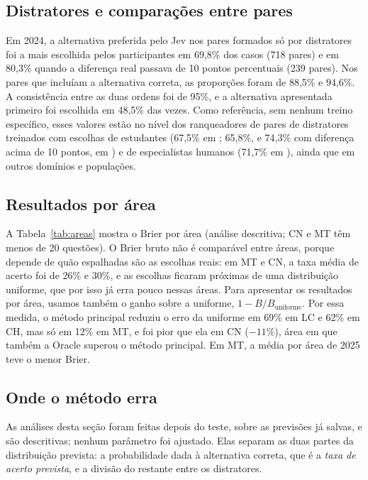 \subsection{Distratores e comparações entre pares}\label{sec:res-pares}

Em 2024, a alternativa preferida pelo Jev nos pares formados só por distratores foi a mais escolhida pelos participantes em 69,8\% dos casos (718 pares) e em 80,3\% quando a diferença real passava de 10 pontos percentuais (239 pares). Nos pares que incluíam a alternativa correta, as proporções foram de 88,5\% e 94,6\%. A consistência entre as duas ordens foi de 95\%, e a alternativa apresentada primeiro foi escolhida em 48,5\% das vezes. Como referência, sem nenhum treino específico, esses valores estão no nível dos ranqueadores de pares de distratores treinados com escolhas de estudantes (67,5\% em \citealp{lee2025}; 65,8\%, e 74,3\% com diferença acima de 10 pontos, em \citealp{scarlatos2024}) e de especialistas humanos (71,7\% em \citealp{lee2025}), ainda que em outros domínios e populações.

\subsection{Resultados por área}\label{sec:res-areas}

A Tabela~\ref{tab:areas} mostra o Brier por área (análise descritiva; CN e MT têm menos de 20 questões). O Brier bruto não é comparável entre áreas, porque depende de quão espalhadas são as escolhas reais: em MT e CN, a taxa média de acerto foi de 26\% e 30\%, e as escolhas ficaram próximas de uma distribuição uniforme, que por isso já erra pouco nessas áreas. Para apresentar os resultados por área, usamos também o ganho sobre a uniforme, $1 - B/B_{\text{uniforme}}$. Por essa medida, o método principal reduziu o erro da uniforme em 69\% em LC e 62\% em CH, mas só em 12\% em MT, e foi pior que ela em CN ($-11\%$), área em que também a Oracle superou o método principal. Em MT, a média por área de 2025 teve o menor Brier.



\subsection{Onde o método erra}\label{sec:res-erros}

As análises desta seção foram feitas depois do teste, sobre as previsões já salvas, e são descritivas; nenhum parâmetro foi ajustado. Elas separam as duas partes da distribuição prevista: a probabilidade dada à alternativa correta, que é a \emph{taxa de acerto prevista}, e a divisão do restante entre os distratores.

